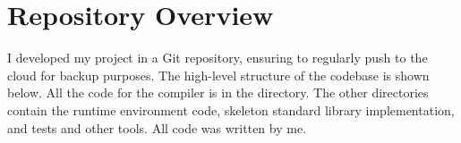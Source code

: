 \documentclass[00-main.tex]{subfiles}
\begin{document}
\section{Repository Overview}

I developed my project in a Git repository, ensuring to regularly push to the cloud for backup purposes.
The high-level structure of the codebase is shown below.
All the code for the compiler is in the  directory.
The other directories contain the runtime environment code, skeleton standard library implementation, and tests and other tools.
All code was written by me.

\newlength\IndentWidth\setlength\IndentWidth{1em}
\end{document}

